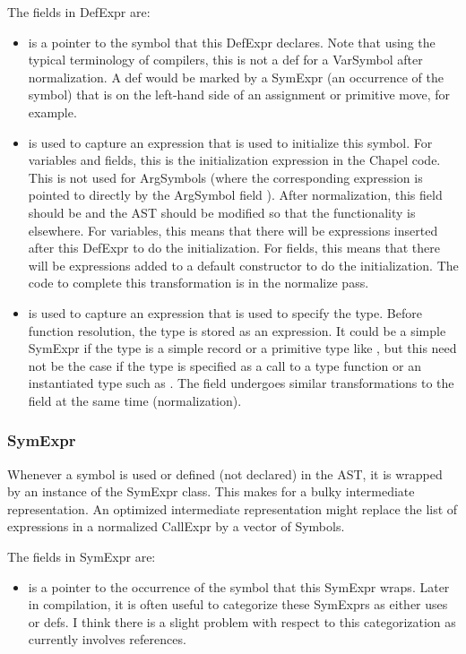\documentclass[10pt]{article}
\begin{document}
The fields in DefExpr are:
\begin{itemize}
\item {} is a pointer to the symbol that this DefExpr
  declares.  Note that using the typical terminology of compilers,
  this is not a def for a VarSymbol after normalization.  A def would
  be marked by a SymExpr (an occurrence of the symbol) that is on the
  left-hand side of an assignment or primitive move, for example.
\item {} is used to capture an expression that is used to
  initialize this symbol.  For variables and fields, this is the
  initialization expression in the Chapel code.  This is not used for
  ArgSymbols (where the corresponding expression is pointed to
  directly by the ArgSymbol field ).  After
  normalization, this field should be  and the AST should be
  modified so that the functionality is elsewhere.  For variables,
  this means that there will be expressions inserted after this
  DefExpr to do the initialization.  For fields, this means that there
  will be expressions added to a default constructor to do the
  initialization.  The code to complete this transformation is in the
  normalize pass.
\item {} is used to capture an expression that is
  used to specify the type.  Before function resolution, the type is
  stored as an expression.  It could be a simple SymExpr if the type
  is a simple record  or a primitive type like , but
  this need not be the case if the type is specified as a call to a
  type function or an instantiated type such as .  The
   field undergoes similar transformations to the
   field at the same time (normalization).
\end{itemize}

\subsubsection{SymExpr}
\label{sec:symexpr}

Whenever a symbol is used or defined (not declared) in the AST, it is
wrapped by an instance of the SymExpr class.  This makes for a bulky
intermediate representation.  An optimized intermediate representation
might replace the list of expressions in a normalized CallExpr by a
vector of Symbols.

The fields in SymExpr are:
\begin{itemize}
\item {} is a pointer to the occurrence of the symbol
  that this SymExpr wraps.  Later in compilation, it is often useful
  to categorize these SymExprs as either uses or defs.  I think there
  is a slight problem with respect to this categorization as currently
  involves references.
\end{itemize}
\end{document}
